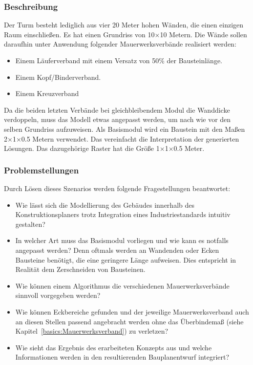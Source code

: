 \subsubsection*{Beschreibung}
Der Turm besteht lediglich aus vier 20 Meter hohen Wänden, die einen einzigen Raum einschließen.
Es hat einen Grundriss von 10$\times$10 Metern.
Die Wände sollen daraufhin unter Anwendung folgender Mauerwerksverbände realisiert werden:
\begin{itemize}
  \item Einem Läuferverband mit einem Versatz von 50\% der Bausteinlänge.
  \item Einem Kopf/Binderverband.
  \item Einem Kreuzverband 
\end{itemize}
Da die beiden letzten Verbände bei gleichbleibendem Modul die Wanddicke verdoppeln, muss das Modell etwas angepasst werden, um nach wie vor den selben Grundriss aufzuweisen.
Als Basismodul wird ein Baustein mit den Maßen 2$\times$1$\times$0.5 Metern verwendet.
Das vereinfacht die Interpretation der generierten Lösungen.
Das dazugehörige Raster hat die Größe 1$\times$1$\times$0.5 Meter.

\subsubsection*{Problemstellungen}
Durch Lösen dieses Szenarios werden folgende Fragestellungen beantwortet:
\begin{itemize}
  \item Wie lässt sich die Modellierung des Gebäudes innerhalb des Konstruktionsplaners trotz Integration eines Industriestandards intuitiv gestalten?
  \item In welcher Art muss das Basismodul vorliegen und wie kann es notfalls angepasst werden? 
  Denn oftmals werden an Wandenden oder Ecken Bausteine benötigt, die eine geringere Länge aufweisen.
  Dies entspricht in Realität dem Zerschneiden von Bausteinen.
  \item Wie können einem Algorithmus die verschiedenen Mauerwerksverbände sinnvoll vorgegeben werden?
  \item Wie können Eckbereiche gefunden und der jeweilige Mauerwerksverband auch an diesen Stellen passend angebracht werden ohne das Überbindemaß (siehe Kapitel~\ref{basics:Mauerwerksverband}) zu verletzen?
  \item Wie sieht das Ergebnis des erarbeiteten Konzepts aus und welche Informationen werden in den resultierenden Bauplanentwurf integriert?
\end{itemize}

